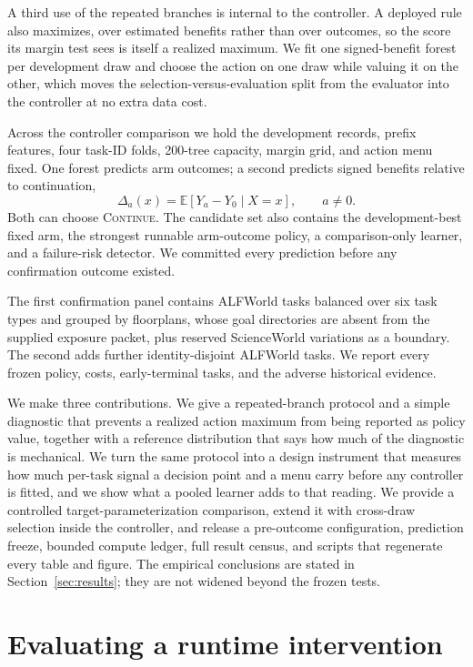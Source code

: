 A third use of the repeated branches is internal to the controller. A deployed rule also maximizes, over estimated benefits rather than over outcomes, so the score its margin test sees is itself a realized maximum. We fit one signed-benefit forest per development draw and choose the action on one draw while valuing it on the other, which moves the selection-versus-evaluation split from the evaluator into the controller at no extra data cost.

Across the controller comparison we hold the development records, prefix features, four task-ID folds, 200-tree capacity, margin grid, and action menu fixed. One forest predicts arm outcomes; a second predicts signed benefits relative to continuation,
\begin{equation}
\Delta_a(x)=\mathbb{E}[Y_a-Y_0\mid X=x],\qquad a\neq0.
\end{equation}
Both can choose \textsc{Continue}. The candidate set also contains the development-best fixed arm, the strongest runnable arm-outcome policy, a comparison-only learner, and a failure-risk detector. We committed every prediction before any confirmation outcome existed.

The first confirmation panel contains \AlfPlanned{} ALFWorld tasks balanced over six task types and grouped by \AlfGroups{} floorplans, whose goal directories are absent from the supplied exposure packet, plus \SwPlanned{} reserved ScienceWorld variations as a boundary. The second adds \EventPlanned{} further identity-disjoint ALFWorld tasks. We report every frozen policy, costs, early-terminal tasks, and the adverse historical evidence.

We make three contributions. We give a repeated-branch protocol and a simple diagnostic that prevents a realized action maximum from being reported as policy value, together with a reference distribution that says how much of the diagnostic is mechanical. We turn the same protocol into a design instrument that measures how much per-task signal a decision point and a menu carry before any controller is fitted, and we show what a pooled learner adds to that reading. We provide a controlled target-parameterization comparison, extend it with cross-draw selection inside the controller, and release a pre-outcome configuration, prediction freeze, bounded compute ledger, full result census, and scripts that regenerate every table and figure. The empirical conclusions are stated in Section~\ref{sec:results}; they are not widened beyond the frozen tests.

\section{Evaluating a runtime intervention}
\label{sec:estimand}

